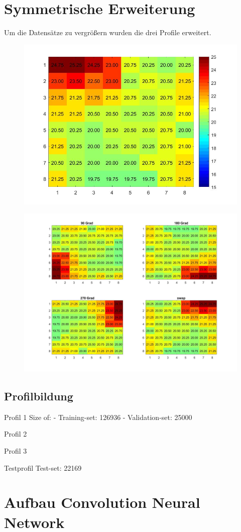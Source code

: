 \section{Symmetrische Erweiterung}

Um die Datensätze zu vergrößern wurden die drei Profile erweitert. 

\begin{figure}[H]
	\centering
	\includegraphics[width=0.3\linewidth]{fig/original}
	\caption{}
	\label{fig:original}
\end{figure}

\begin{figure}[H]
	\centering
	\includegraphics[width=0.7\linewidth]{fig/rotated}
	\caption{}
	\label{fig:rotated}
\end{figure}



\subsection{Profilbildung}




Profil 1
Size of:
- Training-set:         126936
- Validation-set:       25000

Profil 2



Profil 3


Testprofil Test-set:             22169




\section{Aufbau Convolution Neural Network}




